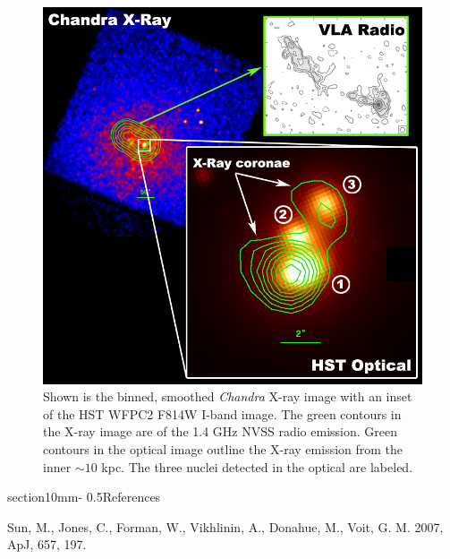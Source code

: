 \documentclass[letterpaper,11pt]{article}
\makeatletter
\renewcommand{\section}{\@startsection%
{section}{1}{0mm}{-\baselineskip}%
{0.5\baselineskip}{\normalfont\Large\bfseries}}%
\makeatother
\begin{document}
\begin{figure}[t]
\begin{minipage}[t]{0.5\linewidth}
	\includegraphics*[width=\columnwidth, trim=0mm 0mm 0mm 0mm, clip]{xr_opt}
	\caption{\small
	Shown is the binned, smoothed {\it{Chandra}} X-ray image with an inset
	of the HST WFPC2 F814W I-band image. The green contours in the X-ray
	image are of the 1.4 GHz NVSS radio emission. Green contours in the
	optical image outline the X-ray emission from the inner
	$\sim10$ kpc. The three nuclei detected in the optical are labeled.
	}
	\label{fig:hst}
    \end{minipage}
\end{figure}





\section{References}

Sun, M., Jones, C., Forman, W., Vikhlinin, A., Donahue, M., Voit, G. M. 2007, ApJ, 657, 197.
\end{document}
